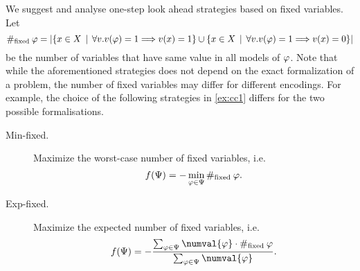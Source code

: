\newcommand{\fixed}{\#_\textrm{fixed}\:}
We suggest and analyse one-step look ahead strategies based on fixed variables.
Let
\[
\fixed\form = |\{ x\in\Var \| \forall v.v(\form)=1 ==> v(x)=1 \}
                  \cup\{ x\in\Var \| \forall v.v(\form)=1 ==> v(x)=0 \}|
\]
be the number of variables that have same value in all models of $\varphi$.
Note that while the aforementioned strategies does not depend on the exact
  formalization of a problem, the number of fixed variables may differ for
  different encodings.
For example, the choice of the following strategies in \autoref{ex:cc1} differs
  for the two possible formalisations.

\begin{description}
\item[Min-fixed.] Maximize the worst-case number of fixed variables, i.e.
\[
f(\formset) = -\min_{\form\in\formset} \fixed{\form}.
\]
\item[Exp-fixed.] Maximize the expected number of fixed variables, i.e.
\[
f(\formset) = -\frac{\sum_{\form\in\formset}\numval{\form}\cdot\fixed{\form}}{\sum_{\form\in\formset}\numval{\form}}.
\]
\end{description}

